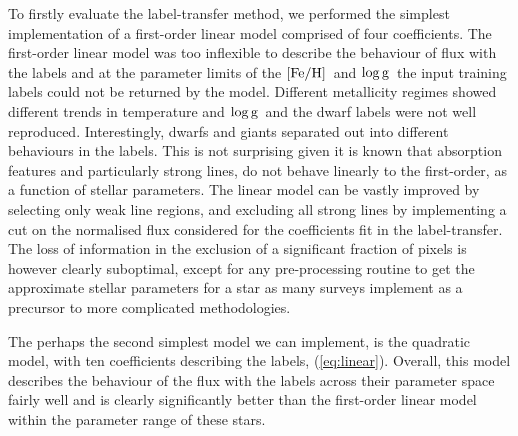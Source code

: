 \documentclass[12pt, preprint]{aastex}
\newcommand{\feh}{\mbox{$\rm [Fe/H]$}}
\newcommand{\logg}{\mbox{$\rm \log g$}}
\newcommand{\tc}{\textsl{The~Cannon}}
\begin{document}
To firstly evaluate the label-transfer method, we performed the simplest implementation of a first-order linear model comprised of four coefficients. The first-order linear model was too inflexible to describe the behaviour of flux with the labels and at the parameter limits of the \feh\ and \logg\ the input training labels could not be returned by the model. Different metallicity regimes showed different trends in temperature and \logg\ and the dwarf labels were not well reproduced. Interestingly, dwarfs and giants separated out into different behaviours in the labels. This is not surprising given it is known that absorption features and particularly strong lines, do not behave linearly to the first-order, as a function of stellar parameters. 
The linear model can be vastly improved by selecting only weak line regions, and excluding all strong lines by implementing a cut on the normalised flux considered for the coefficients fit in the label-transfer. The loss of information in the exclusion of a significant fraction of pixels is however clearly suboptimal, except for any pre-processing routine to get the approximate stellar parameters for a star as many surveys implement as a precursor to more complicated methodologies. 









The perhaps the second simplest model we can implement, is the quadratic model, with ten coefficients describing the labels, (\ref{eq:linear}).  Overall, this model describes the behaviour of the flux with the labels across their parameter space fairly well and is clearly significantly better than the first-order linear model within the parameter range of these stars. 
\end{document}
